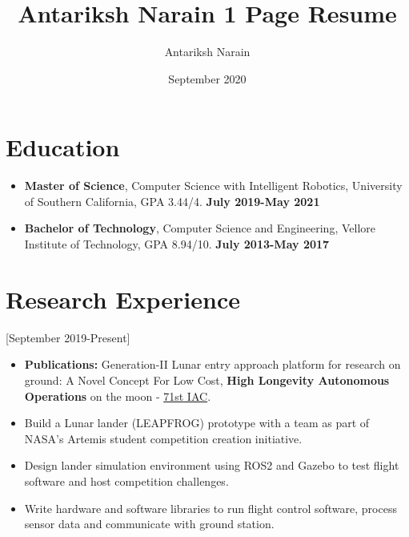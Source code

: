 \documentclass[10pt]{article}
\title{Antariksh Narain 1 Page Resume}
\author{Antariksh Narain}
\date{September 2020}
\begin{document}

\makecvtitle %

\section{Education}

\begin{itemize}
\item \textbf{Master of Science}, Computer Science with Intelligent Robotics, University of Southern California, GPA 3.44/4. \null\hfill \textbf{July 2019-May 2021}
\item \textbf{Bachelor of Technology}, Computer Science and Engineering, Vellore Institute of Technology, GPA 8.94/10. \null\hfill \textbf{July 2013-May 2017}
\end{itemize}

\section{Research Experience}

[September 2019-Present]

\begin{itemize}
\item \textbf{Publications:} Generation-II Lunar entry approach platform for research on ground: A Novel Concept For Low Cost, \textbf{High Longevity Autonomous Operations} on the moon - \href{https://iac2020.vfairs.com/}{71st IAC}.
\item Build a Lunar lander (LEAPFROG) prototype with a team as part of NASA's Artemis student competition creation initiative.
\item Design lander simulation environment using ROS2 and Gazebo to test flight software and host competition challenges.
\item Write hardware and software libraries to run flight control software, process sensor data and communicate with ground station.
\end{itemize}
\end{document}
